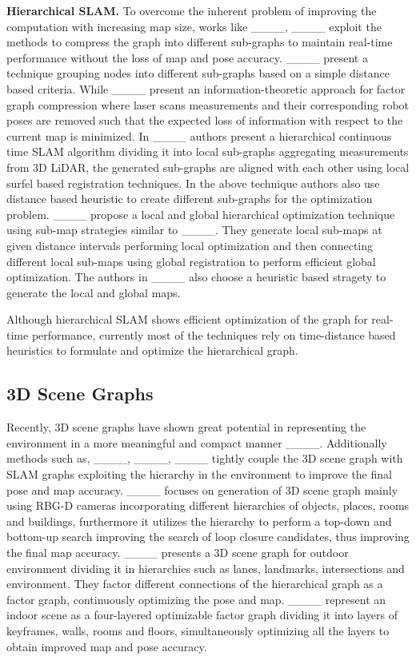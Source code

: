 \textbf{Hierarchical SLAM.} 
To overcome the inherent problem of improving the computation with increasing map size, works like ____, ____ exploit the methods to compress the graph into different sub-graphs to maintain real-time performance without the loss of map and pose accuracy.  ____ present a technique grouping nodes into different sub-graphs based on a simple distance based criteria. While ____ present an information-theoretic approach for factor graph compression where laser scans measurements
and their corresponding robot poses are removed such that
the expected loss of information with respect to the current
map is minimized. In ____ authors present a hierarchical continuous time SLAM algorithm dividing it into local sub-graphs aggregating measurements from 3D LiDAR, the generated sub-graphs are aligned with each other using local surfel based registration techniques. In the above technique authors also use distance based heuristic to create different sub-graphs for the optimization problem. ____ propose a local and global hierarchical optimization technique using sub-map strategies similar to ____. They generate local sub-maps at given distance intervals performing local optimization and then connecting different local sub-maps using global registration to perform efficient global optimization. The authors in ____ also choose a heuristic based stragety to generate the local and global maps. 

Although hierarchical SLAM shows efficient optimization of the graph for real-time performance, currently most of the techniques rely on time-distance based heuristics to formulate and optimize the hierarchical graph. 


\subsection{3D Scene Graphs}
Recently, 3D scene graphs have shown great potential in representing the environment in a more meaningful and compact manner ____. Additionally methods such as, ____, ____, ____ tightly couple the 3D scene graph with SLAM graphs exploiting the hierarchy in the environment to improve the final pose and map accuracy. ____ focuses on generation of 3D scene graph mainly using RBG-D cameras incorporating different hierarchies of objects, places, rooms and buildings, furthermore it utilizes the hierarchy to perform a top-down and bottom-up search improving the search of loop closure candidates, thus improving the final map accuracy. ____ presents a 3D scene graph for outdoor environment dividing it in hierarchies such as lanes, landmarks, intersections and environment. They factor different connections of the hierarchical graph as a factor graph, continuously optimizing the pose and map. ____ represent an indoor scene as a four-layered optimizable factor graph dividing it into layers of keyframes, walls, rooms and floors, simultaneously optimizing all the layers to obtain improved map and pose accuracy. 

